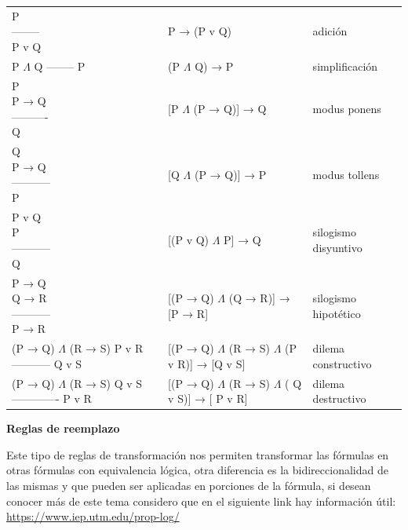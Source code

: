 \documentclass[11pt,fleqn]{book} %
\begin{document}
\clearpage
\begin{tabular}{|l|l|l|}
\hline
	\thead{Regla de inferencia}	& \thead{Tautología} & \thead{Nombre}\\
\hline
	\makecell[l]{P \\-------- \\P v Q}  & P → (P v Q) & adición\\
\hline
	\makecell[l]{P $\Lambda$ Q\\--------\\P} & (P $\Lambda$ Q) → P & simplificación\\
\hline
	\makecell[l]{P \\P → Q\\----------\\Q} & [P $\Lambda$ (P → Q)] → Q & modus ponens\\
\hline
	\makecell[l]{Q \\P → Q\\-----------\\P} & [Q $\Lambda$ (P → Q)] → P & modus tollens\\
\hline
	\makecell[l]{P v Q \\P\\-----------\\Q} & [(P v Q) $\Lambda$ P] → Q & silogismo disyuntivo\\
\hline
	\makecell[l]{P → Q \\Q → R\\-----------\\P → R} & [(P → Q) $\Lambda$ (Q → R)] → [P → R] & silogismo hipotético\\
\hline
	\makecell[l]{(P → Q) $\Lambda$ (R → S) \\P v R\\-----------\\Q v S} & [(P → Q) $\Lambda$ (R → S) $\Lambda$ (P v R)] → [Q v S] & dilema constructivo\\
\hline
	\makecell[l]{(P → Q) $\Lambda$ (R → S) \\Q v S\\-------------\\P v R} & [(P → Q) $\Lambda$  (R → S) $\Lambda$  ( Q v S)] → [ P v R] & dilema destructivo\\
\hline
\end{tabular}

\clearpage
\textbf{Reglas de reemplazo} 

Este tipo de reglas de transformación nos permiten transformar las fórmulas en otras fórmulas con equivalencia lógica, otra diferencia es la bidireccionalidad de las mismas y que pueden ser aplicadas en porciones de la fórmula, si desean conocer más de este tema considero que en el siguiente link hay información útil: \url{https://www.iep.utm.edu/prop-log/}
\end{document}
